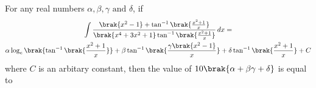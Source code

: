     \item For any real numbers $\alpha, \beta, \gamma \text{ and } \delta$, if
	\begin{multline*}
		\int \frac{\brak{x^2 - 1} + \tan^{-1}{\brak{\frac{x^2+1}{x}}}}{\brak{x^4 + 3x^2 + 1}\tan^{-1}{\brak{\frac{x^2+1}{x}}}} \, dx = \\
        \alpha\log_{e}\brak{\tan^{-1}{\brak{\frac{x^2+1}{x}}}} + \beta\tan^{-1}{\brak{\frac{\gamma\brak{x^2-1}}{x}}} + \delta\tan^{-1}{\brak{\frac{x^2+1}{x}}} + C
	\end{multline*}
	where $C$ is an arbitary constant, then the value of $10\brak{\alpha + \beta\gamma + \delta}$ is equal to
    \hfill{}